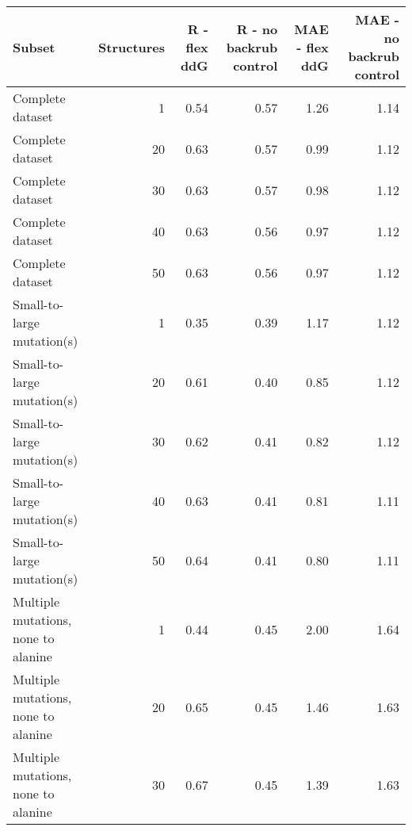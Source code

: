 \begin{table}
\begin{tabular}{lrrrrr}
\toprule
                              Subset &  Structures &  R - flex ddG &  R - no backrub control &  MAE - flex ddG &  MAE - no backrub control \\
\midrule
                    Complete dataset &           1 &          0.54 &                    0.57 &            1.26 &                      1.14 \\
                    Complete dataset &          20 &          0.63 &                    0.57 &            0.99 &                      1.12 \\
                    Complete dataset &          30 &          0.63 &                    0.57 &            0.98 &                      1.12 \\
                    Complete dataset &          40 &          0.63 &                    0.56 &            0.97 &                      1.12 \\
                    Complete dataset &          50 &          0.63 &                    0.56 &            0.97 &                      1.12 \\
          Small-to-large mutation(s) &           1 &          0.35 &                    0.39 &            1.17 &                      1.12 \\
          Small-to-large mutation(s) &          20 &          0.61 &                    0.40 &            0.85 &                      1.12 \\
          Small-to-large mutation(s) &          30 &          0.62 &                    0.41 &            0.82 &                      1.12 \\
          Small-to-large mutation(s) &          40 &          0.63 &                    0.41 &            0.81 &                      1.11 \\
          Small-to-large mutation(s) &          50 &          0.64 &                    0.41 &            0.80 &                      1.11 \\
 Multiple mutations, none to alanine &           1 &          0.44 &                    0.45 &            2.00 &                      1.64 \\
 Multiple mutations, none to alanine &          20 &          0.65 &                    0.45 &            1.46 &                      1.63 \\
 Multiple mutations, none to alanine &          30 &          0.67 &                    0.45 &            1.39 &                      1.63 \\

\end{tabular}
\end{table}
